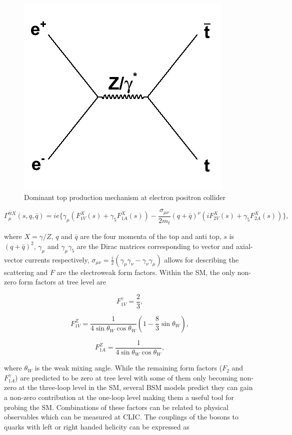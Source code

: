 \begin{figure}
\centering
\includegraphics[width=0.35\linewidth]{Theory/fig/ttFeynmann}
\caption[Dominant top production mechanism at electron positron colliders]{Dominant top production mechanism at electron positron collider}
\label{fig:topFeynmann}
\end{figure}

\begin{equation}
\Gamma_{\mu}^{t\bar{t}X}(s,q,\bar{q})= ie\{ \gamma_{\mu}(F_{1V}^{X}(s)+ \gamma_{5}F_{1A}^{X}(s)) - \frac{\sigma_{\mu\nu}}{2m_t}(q+\bar{q})^{\nu}(iF_{2V}^{X}(s) + \gamma_{5}F_{2A}^{X}(s))\},
\end{equation}

where $X=\gamma /Z$, $q$ and $\bar{q}$ are the four momenta of the top and anti top, $s$ is $(q+\bar{q})^2$, $\gamma_\mu$ and $\gamma_\mu\gamma_5$ are the Dirac matrices corresponding to vector and axial-vector currents respectively, $\sigma_{\mu\nu}=\frac{i}{2}(\gamma_\mu \gamma_\nu -\gamma_\nu \gamma_\mu)$ allows for describing the scattering and $F$ are the electroweak form factors. Within the \ac{SM}, the only non-zero form factors at tree level are

\begin{equation}
F_{1V}^{\gamma}=\frac{2}{3},
\end{equation}

\begin{equation}
F_{1V}^{Z}=\frac{1}{4\sin\theta_{W}\cos\theta_{W}}(1-\frac{8}{3}\sin\theta_{W}),
\end{equation}

\begin{equation}
F_{1A}^{Z}=\frac{1}{4\sin\theta_{W}\cos\theta_{W}},
\end{equation}

where $\theta_W$ is the weak mixing angle. While the remaining form factors ($F_2$ and $F_{1A}^{\gamma}$) are predicted to be zero at tree level with some of them only becoming non-zero at the three-loop level in the \ac{SM}, several \ac{BSM} models predict they can gain a non-zero contribution at the one-loop level\cite{Abe:2001swa} making them a useful tool for probing the \ac{SM}. Combinations of these factors can be related to physical observables which can be measured at CLIC. The couplings of the bosons to quarks with left or right handed helicity can be expressed as

